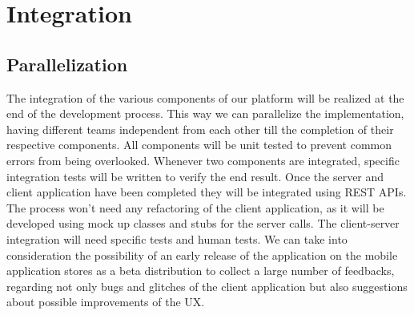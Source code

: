 \section{Integration}

\subsection{Parallelization}
The integration of the various components of our platform will be realized at the end of
the development process. This way we can parallelize the implementation, having different teams
independent from each other till the completion of their respective components.
All components will be unit tested to prevent common errors from being overlooked.
\newline
\newline
Whenever two components are integrated, specific integration tests will be written to
verify the end result.
\newline
\newline
Once the server and client application have been completed they will be integrated using REST APIs.
The process won't need any refactoring of the client application, as it will be developed using mock up classes and stubs for the server calls.
\newline
The client-server integration will need specific tests and human tests. We can take into consideration the
possibility of an early release of the application on the mobile application stores as a beta distribution
to collect a large number of feedbacks, regarding not only bugs and glitches of the client application but
also suggestions about possible improvements of the UX.

